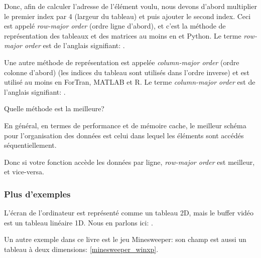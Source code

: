 
Donc, afin de calculer l'adresse de l'élément voulu, nous devons d'abord multiplier
le premier index par 4 (largeur du tableau) et puis ajouter le second index.
Ceci est appelé \emph{row-major order} (ordre ligne d'abord),
et c'est la méthode de représentation des tableaux et des matrices au moins en \CCpp
et Python.
Le terme \emph{row-major order} est de l'anglais signifiant: .

Une autre méthode de représentation est appelée \emph{column-major order} (ordre colonne
d'abord) (les indices du tableau sont utilisés dans l'ordre inverse) et est utilisé
au moins en ForTran, MATLAB et R.
Le terme \emph{column-major order} est de l'anglais signifiant: .

Quelle méthode est la meilleure?

En général, en termes de performance et de mémoire cache, le meilleur schéma pour
l'organisation des données est celui dans lequel les éléments sont accédés séquentiellement.

Donc si votre fonction accède les données par ligne, \emph{row-major order} est meilleur,
et vice-versa.




%

\subsubsection{Plus d'exemples}

L'écran de l'ordinateur est représenté comme un tableau 2D, mais le buffer vidéo
est un tableau linéaire 1D.
Nous en parlons ici: .

Un autre exemple dans ce livre est le jeu Minesweeper: son champ est aussi un tableau
à deux dimensions: \ref{minesweeper_winxp}.

